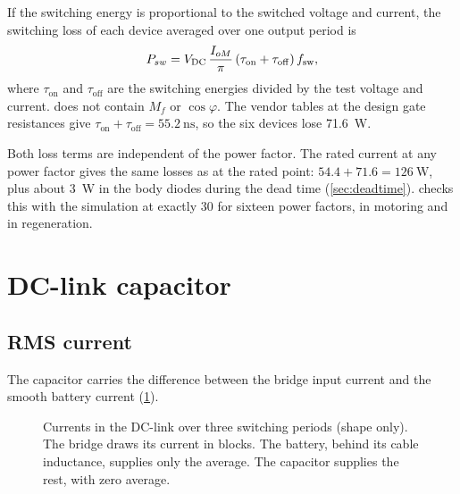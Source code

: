 If the switching energy is proportional to the switched voltage and
current, the switching loss of each device averaged over one output period
is
%
\begin{equation}
  P_{sw} = V_{\mathrm{DC}}\,\frac{I_{oM}}{\pi}\,(\tau_\mathrm{on} + \tau_\mathrm{off})\,f_{\mathrm{sw}} ,
  \label{eq:psw}
\end{equation}
%
where $\tau_\mathrm{on}$ and $\tau_\mathrm{off}$ are the switching energies
divided by the test voltage and current.  does not contain
$M_f$ or $\cos\varphi$. The vendor tables at the design gate resistances
give $\tau_\mathrm{on} + \tau_\mathrm{off} = \SI{55.2}{\nano\second}$, so the
six devices lose \SI{71.6}{\watt}.

Both loss terms are independent of the power factor. The rated current at
any power factor gives the same losses as at the rated point:
$54.4 + 71.6 = \SI{126}{\watt}$, plus about \SI{3}{\watt} in the body
diodes during the dead time (\cref{sec:deadtime}).  checks this with the simulation at
exactly \SI{30}{\Arms} for sixteen power factors, in motoring and in
regeneration.

\section{DC-link capacitor}
\label{sec:dclink}

\subsection{RMS current}

The capacitor carries the difference between the bridge input current and the
smooth battery current (\cref{fig:dccurrent}).

\begin{figure}[H]
\centering

\caption{Currents in the DC-link over three switching periods (shape only).
The bridge draws its current in blocks. The battery, behind its cable
inductance, supplies only the average. The capacitor supplies the rest, with
zero average.}
\label{fig:dccurrent}
\end{figure}

